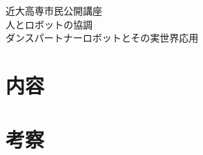 \documentclass{jsarticle}
\begin{document}




\begin{table}[htbp]
		\centering
		\begin{tablar}
				近大高専市民公開講座 \\
				人とロボットの協調 \\
				ダンスパートナーロボットとその実世界応用 \\
		\end{tablar}
\end{table}

\section{内容}


\section{考察}

\end{document}
